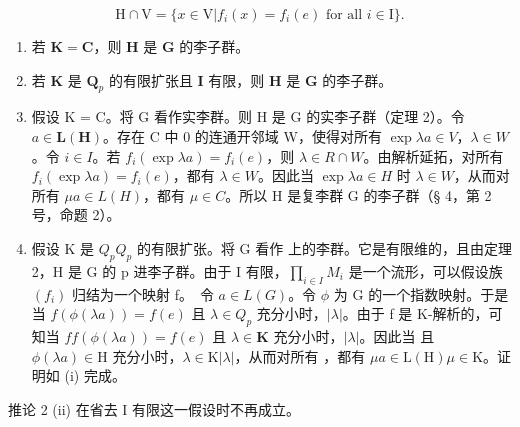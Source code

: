 \[
\mathrm{H} \cap \mathrm{V} = \{x \in \mathrm{V} | f _ {i} (x) = f _ {i} (e) \text {   for   all   } i \in \mathrm{I} \}.
\]

\begin{enumerate}
\def\labelenumi{(\roman{enumi})}
\item
  若 \(\mathbf{K} = \mathbf{C}\)，则 \(\mathbf{H}\) 是 \(\mathbf{G}\) 的李子群。
\item
  若 \(\mathbf{K}\) 是 \(\mathbf{Q}_p\) 的有限扩张且 \(\mathbf{I}\) 有限，则 \(\mathbf{H}\) 是 \(\mathbf{G}\) 的李子群。
\item
  假设 K = C。将 G 看作实李群。则 H 是 G 的实李子群（定理 2）。令 \(a \in \mathbf{L}(\mathbf{H})\)。存在 C 中 0 的连通开邻域 W，使得对所有 \(\exp \lambda a \in V\)，\(\lambda \in W\)。令 \(i \in I\)。若 \(f_i(\exp \lambda a) = f_i(e)\)，则 \(\lambda \in R \cap W\)。由解析延拓，对所有 \(f_i(\exp \lambda a) = f_i(e)\)，都有 \(\lambda \in W\)。因此当 \(\exp \lambda a \in H\) 时 \(\lambda \in W\)，从而对所有 \(\mu a \in L(H)\)，都有 \(\mu \in C\)。所以 H 是复李群 G 的李子群（§ 4，第 2 号，命题 2）。
\item
  假设 K 是 \(Q_{p}\)\(Q_{p}\) 的有限扩张。将 G 看作  上的李群。它是有限维的，且由定理 2，H 是 G 的 p 进李子群。由于 I 有限，\(\prod_{i\in I} M_{i}\) 是一个流形，可以假设族 \((f_{i})\) 归结为一个映射 f。~令 \(a \in L(G)\)。令 \(\phi\) 为 G 的一个指数映射。于是当 \(f(\phi(\lambda a)) = f(e)\) 且 \(\lambda \in Q_{p}\) 充分小时，\(|\lambda|\)。由于 f 是 K-解析的，可知当 \(f\)\(f(\phi (\lambda a)) = f(e)\) 且 \(\lambda \in \mathbf{K}\) 充分小时，\(|\lambda|\)。因此当  且 \(\phi (\lambda a) \in \mathrm{H}\) 充分小时，\(\lambda \in \mathrm{K}\)\(|\lambda|\)，从而对所有 ，都有 \(\mu a \in \mathrm{L(H)}\)\(\mu \in \mathrm{K}\)。证明如 (i) 完成。
\end{enumerate}

推论 2 (ii) 在省去 I 有限这一假设时不再成立。

